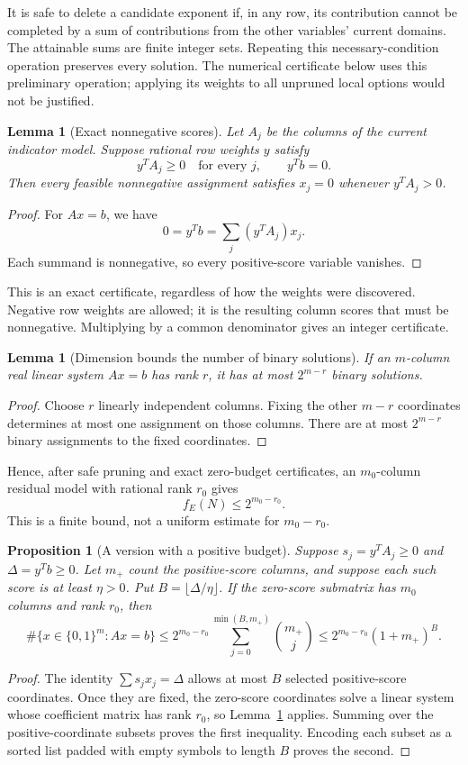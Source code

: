 \documentclass[11pt]{article}
\newtheorem{lemma}[theorem]{Lemma}
\newtheorem{proposition}[theorem]{Proposition}
\begin{document}
It is safe to delete a candidate exponent if, in any row, its contribution cannot be completed by a sum of contributions from the other variables' current domains. The attainable sums are finite integer sets. Repeating this necessary-condition operation preserves every solution. The numerical certificate below uses this preliminary operation; applying its weights to all unpruned local options would not be justified.

\begin{lemma}[Exact nonnegative scores]\label{lem:dual}
Let $A_j$ be the columns of the current indicator model. Suppose rational row weights $y$ satisfy
\[
 y^TA_j\ge0\quad\text{for every }j,\qquad y^Tb=0.
\]
Then every feasible nonnegative assignment satisfies $x_j=0$ whenever $y^TA_j>0$.
\end{lemma}
\begin{proof}
For $Ax=b$, we have
\[
 0=y^Tb=\sum_j(y^TA_j)x_j.
\]
Each summand is nonnegative, so every positive-score variable vanishes.
\end{proof}

This is an exact certificate, regardless of how the weights were discovered. Negative row weights are allowed; it is the resulting column scores that must be nonnegative. Multiplying by a common denominator gives an integer certificate.

\begin{lemma}[Dimension bounds the number of binary solutions]\label{lem:rank}
If an $m$-column real linear system $Ax=b$ has rank $r$, it has at most $2^{m-r}$ binary solutions.
\end{lemma}
\begin{proof}
Choose $r$ linearly independent columns. Fixing the other $m-r$ coordinates determines at most one assignment on those columns. There are at most $2^{m-r}$ binary assignments to the fixed coordinates.
\end{proof}

Hence, after safe pruning and exact zero-budget certificates, an $m_0$-column residual model with rational rank $r_0$ gives
\[
 \boxed{f_E(N)\le2^{m_0-r_0}.}
\]
This is a finite bound, not a uniform estimate for $m_0-r_0$.

\begin{proposition}[A version with a positive budget]\label{prop:budget}
Suppose $s_j=y^TA_j\ge0$ and $\Delta=y^Tb\ge0$. Let $m_+$ count the positive-score columns, and suppose each such score is at least $\eta>0$. Put $B=\lfloor\Delta/\eta\rfloor$. If the zero-score submatrix has $m_0$ columns and rank $r_0$, then
\[
 \#\{x\in\{0,1\}^m:Ax=b\}
 \le 2^{m_0-r_0}\sum_{j=0}^{\min(B,m_+)}\binom{m_+}{j}
 \le 2^{m_0-r_0}(1+m_+)^B.
\]
\end{proposition}
\begin{proof}
The identity $\sum s_jx_j=\Delta$ allows at most $B$ selected positive-score coordinates. Once they are fixed, the zero-score coordinates solve a linear system whose coefficient matrix has rank $r_0$, so Lemma~\ref{lem:rank} applies. Summing over the positive-coordinate subsets proves the first inequality. Encoding each subset as a sorted list padded with empty symbols to length $B$ proves the second.
\end{proof}
\end{document}
